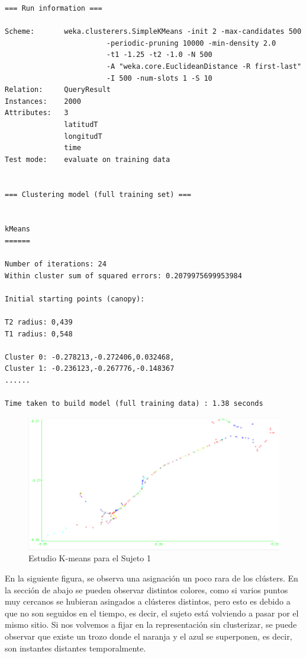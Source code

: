 \documentclass[a4paper, 12pt]{article}
\begin{document}
\begin{verbatim}
=== Run information ===

Scheme:       weka.clusterers.SimpleKMeans -init 2 -max-candidates 500 
						-periodic-pruning 10000 -min-density 2.0 
						-t1 -1.25 -t2 -1.0 -N 500 
						-A "weka.core.EuclideanDistance -R first-last" 
						-I 500 -num-slots 1 -S 10
Relation:     QueryResult
Instances:    2000
Attributes:   3
              latitudT
              longitudT
              time
Test mode:    evaluate on training data


=== Clustering model (full training set) ===


kMeans
======

Number of iterations: 24
Within cluster sum of squared errors: 0.2079975699953984

Initial starting points (canopy):

T2 radius: 0,439     
T1 radius: 0,548     

Cluster 0: -0.278213,-0.272406,0.032468,
Cluster 1: -0.236123,-0.267776,-0.148367
......

Time taken to build model (full training data) : 1.38 seconds
\end{verbatim}


\begin{figure}[H]
	\includegraphics[scale=.5]{../comparativa/kMeansSujeto2.png}
	\caption{Estudio K-means para el Sujeto 1}
\end{figure}

En la siguiente figura, se observa una asignaci\'on un poco rara de los cl\'usters. En la secci\'on de abajo se pueden observar distintos colores, como si varios puntos muy cercanos se hubieran asingados a cl\'usteres distintos, pero esto es debido a que no son seguidos en el tiempo, es decir, el sujeto est\'a volviendo a pasar por el mismo sitio. Si nos volvemos a fijar en la representaci\'on sin clusterizar, se puede observar que existe un trozo donde el naranja y el azul se superponen, es decir, son instantes distantes temporalmente.\\
\end{document}
